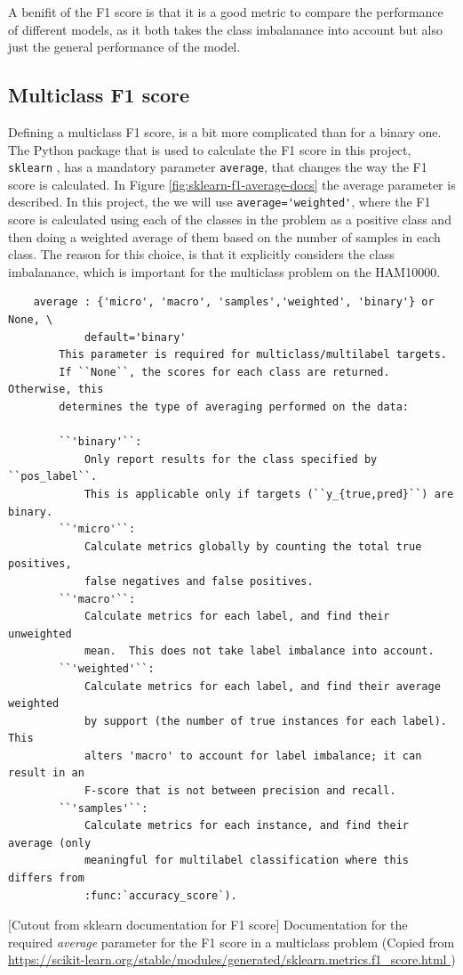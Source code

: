 A benifit of the F1 score is that it is a good metric to compare the performance of different models,
as it both takes the class imbalanance into account but also just the general performance of the model.

\subsection{Multiclass F1 score}
Defining a multiclass F1 score, is a bit more complicated than for a binary one.
The Python package that is used to calculate the F1 score in this project, \verb|sklearn|
\cite{sklearn}, has a mandatory parameter \verb|average|, that changes the way the F1 score is calculated.
In Figure \ref{fig:sklearn-f1-average-docs} the average parameter is described.
In this project, the we will use \verb|average='weighted'|, where the F1 score is calculated
using each of the classes in the problem as a positive class and then doing a weighted average of them based
on the number of samples in each class.
The reason for this choice, is that it explicitly considers the class imbalanance,
which is important for the multiclass problem on the HAM10000.


\begin{center}
    \begin{verbatim}
    average : {'micro', 'macro', 'samples','weighted', 'binary'} or None, \
            default='binary'
        This parameter is required for multiclass/multilabel targets.
        If ``None``, the scores for each class are returned. Otherwise, this
        determines the type of averaging performed on the data:

        ``'binary'``:
            Only report results for the class specified by ``pos_label``.
            This is applicable only if targets (``y_{true,pred}``) are binary.
        ``'micro'``:
            Calculate metrics globally by counting the total true positives,
            false negatives and false positives.
        ``'macro'``:
            Calculate metrics for each label, and find their unweighted
            mean.  This does not take label imbalance into account.
        ``'weighted'``:
            Calculate metrics for each label, and find their average weighted
            by support (the number of true instances for each label). This
            alters 'macro' to account for label imbalance; it can result in an
            F-score that is not between precision and recall.
        ``'samples'``:
            Calculate metrics for each instance, and find their average (only
            meaningful for multilabel classification where this differs from
            :func:`accuracy_score`).
    \end{verbatim}
    [Cutout from sklearn documentation for F1 score]{
        Documentation for the required \textit{average} parameter for the F1 score in a multiclass problem
        (Copied from \url{https://scikit-learn.org/stable/modules/generated/sklearn.metrics.f1_score.html
        })}
    \label{fig:sklearn-f1-average-docs}
\end{center}


